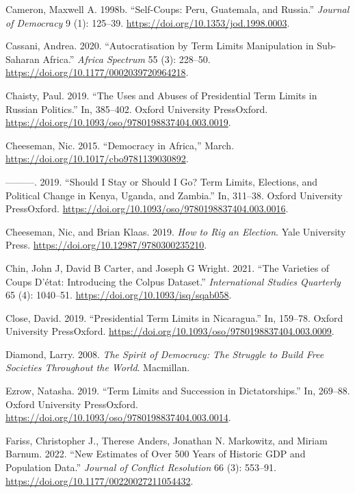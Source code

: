 \documentclass[
  12pt,
]{report}
\newlength{\cslhangindent}
\newenvironment{CSLReferences}[2] %
 {\begin{list}{}{%
  \setlength{\itemindent}{0pt}
  \setlength{\leftmargin}{0pt}
  \setlength{\parsep}{0pt}
  \ifodd #1
   \setlength{\leftmargin}{\cslhangindent}
   \setlength{\itemindent}{-1\cslhangindent}
  \fi
  \setlength{\itemsep}{#2\baselineskip}}}
 {\end{list}}
\begin{document}
\begin{CSLReferences}{1}{0}
Cameron, Maxwell A. 1998b. {``Self-Coups: Peru, Guatemala, and
Russia.''} \emph{Journal of Democracy} 9 (1): 125--39.
\url{https://doi.org/10.1353/jod.1998.0003}.

Cassani, Andrea. 2020. {``Autocratisation by Term Limits Manipulation in
Sub-Saharan Africa.''} \emph{Africa Spectrum} 55 (3): 228--50.
\url{https://doi.org/10.1177/0002039720964218}.

Chaisty, Paul. 2019. {``The Uses and Abuses of Presidential Term Limits
in Russian Politics.''} In, 385--402. Oxford University PressOxford.
\url{https://doi.org/10.1093/oso/9780198837404.003.0019}.

Cheeseman, Nic. 2015. {``Democracy in Africa,''} March.
\url{https://doi.org/10.1017/cbo9781139030892}.

---------. 2019. {``Should I Stay or Should I Go? Term Limits,
Elections, and Political Change in Kenya, Uganda, and Zambia.''} In,
311--38. Oxford University PressOxford.
\url{https://doi.org/10.1093/oso/9780198837404.003.0016}.

Cheeseman, Nic, and Brian Klaas. 2019. \emph{How to Rig an Election}.
Yale University Press. \url{https://doi.org/10.12987/9780300235210}.

Chin, John J, David B Carter, and Joseph G Wright. 2021. {``The
Varieties of Coups D{'}état: Introducing the Colpus Dataset.''}
\emph{International Studies Quarterly} 65 (4): 1040--51.
\url{https://doi.org/10.1093/isq/sqab058}.

Close, David. 2019. {``Presidential Term Limits in Nicaragua.''} In,
159--78. Oxford University PressOxford.
\url{https://doi.org/10.1093/oso/9780198837404.003.0009}.

Diamond, Larry. 2008. \emph{The Spirit of Democracy: The Struggle to
Build Free Societies Throughout the World}. Macmillan.

Ezrow, Natasha. 2019. {``Term Limits and Succession in Dictatorships.''}
In, 269--88. Oxford University PressOxford.
\url{https://doi.org/10.1093/oso/9780198837404.003.0014}.

Fariss, Christopher J., Therese Anders, Jonathan N. Markowitz, and
Miriam Barnum. 2022. {``New Estimates of Over 500 Years of Historic GDP
and Population Data.''} \emph{Journal of Conflict Resolution} 66 (3):
553--91. \url{https://doi.org/10.1177/00220027211054432}.


\end{CSLReferences}
\end{document}
